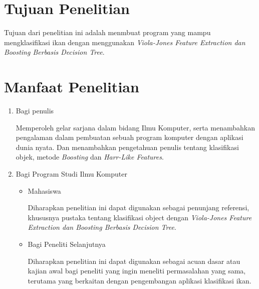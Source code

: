 \section{Tujuan Penelitian}
	Tujuan dari penelitian ini adalah menmbuat program yang mampu
	mengklasifikasi ikan dengan menggunakan \textit{Viola-Jones Feature Extraction dan Boosting Berbasis 
	Decision Tree}.

\section{Manfaat Penelitian}
\begin{enumerate}
	\item Bagi penulis
		
	Memperoleh gelar sarjana dalam bidang Ilmu Komputer, serta menambahkan 
	pengalaman dalam pembuatan sebuah program komputer dengan aplikasi dunia 
	nyata. Dan menambahkan pengetahuan penulis tentang klasifikasi objek, metode 
	\textit{Boosting} dan \textit{Harr-Like Features}.
		
	\item Bagi Program Studi Ilmu Komputer
	
	\begin{itemize}
		\item Mahasiswa
		
		Diharapkan penelitian ini dapat digunakan sebagai penunjang referensi, 
		khususnya pustaka tentang klasifikasi object dengan 
		\textit{Viola-Jones Feature Extraction dan Boosting Berbasis 
		Decision Tree}.

		\item Bagi Peneliti Selanjutnya
		
		Diharapkan penelitian ini dapat digunakan sebagai acuan dasar atau kajian 
		awal bagi peneliti yang ingin meneliti permasalahan yang sama, terutama 
		yang berkaitan dengan pengembangan aplikasi klasifikasi ikan.

	\end{itemize}
			
\end{enumerate}

\begin{comment}

\end{comment}
